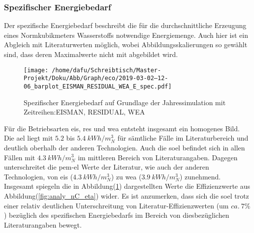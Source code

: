 \documentclass[onecolumn,10pt,titlepage]{article}
\begin{document}
%
%



\subsubsection{Spezifischer Energiebedarf}
Der spezifische Energiebedarf beschreibt die für die durchschnittliche Erzeugung eines Normkubikmeters Wasserstoffs notwendige Energiemenge. Auch hier ist ein Abgleich mit Literaturwerten möglich, wobei Abbildungsskalierungen so gewählt sind, dass deren Maximalwerte nicht mit abgebildet wird.\\
\begin{figure}[H]

	\centering
	\texttt{[image: /home/dafu/Schreibtisch/Master-Projekt/Doku/Abb/Graph/eco/2019-03-02--12-06\_barplot\_EISMAN\_RESIDUAL\_WEA\_E\_spec.pdf]}
	\caption[Spezifischer Energiebedarf EIS, RES, WEA]{Spezifischer Energiebedarf auf Grundlage der Jahressimulation mit Zeitreihen:EISMAN, RESIDUAL, WEA }
	\label{fig:analy_nC_Espec}
\end{figure}
Für die Betriebsarten \gls{eis}, \gls{res} und \gls{wea} entsteht insgesamt ein homogenes Bild. Die \gls{ael} liegt mit $5.2$ bis $5.4~kWh/m^3_N$ für sämtliche Fälle im Literaturbereich und deutlich oberhalb der anderen Technologien. Auch die \gls{soel} befindet sich in allen Fällen mit $4.3~kWh/m^3_N$ im mittleren Bereich von Literaturangaben. Dagegen unterschreitet die \gls{pem}-\gls{el} Werte der Literatur, wie auch der anderen Technologien, von \gls{eis} ($4.3~kWh/m^3_N$) zu \gls{wea} ($3.9~kWh/m^3_N$) zunehmend. Insgesamt spiegeln die in Abbildung(\ref{fig:analy_nC_Espec}) dargestellten Werte die Effizienzwerte aus Abbildung(\ref{fig:analy_nC_eta}) wider. Es ist anzumerken, dass sich die \gls{soel} trotz einer relativ deutlichen Unterschreitung von Literatur-Effizienzwerten (um $ca.~7\%$) bezüglich des spezifischen Energiebedarfs im Bereich von diesbezüglichen Literaturangaben bewegt.
\end{document}
